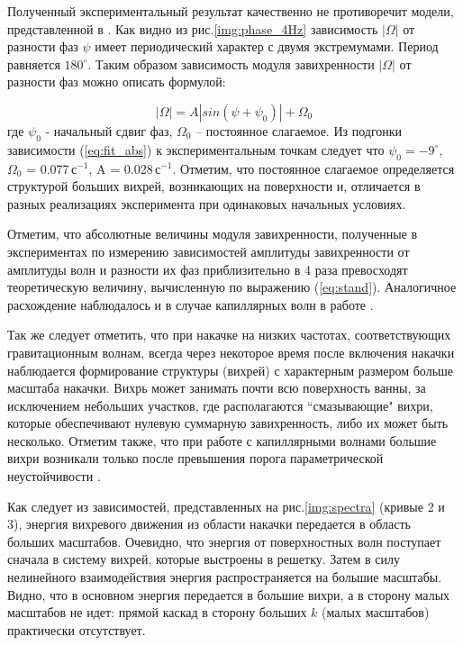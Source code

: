 Полученный экспериментальный результат качественно не противоречит модели, представленной в \cite{parf}. Как видно из рис.\ref{img:phase_4Hz} зависимость $|\Omega|$ от разности фаз $\psi$ имеет периодический характер с двумя экстремумами. Период равняется $180^\circ$. Таким образом зависимость модуля завихренности $|\Omega|$ от разности фаз можно описать формулой: 

\begin{equation}\label{eq:fit_abs}
|\Omega| = A |sin(\psi+\psi_0)| + \Omega_0
\end{equation}
где $\psi_0$ - начальный сдвиг фаз, $\Omega_0$ – постоянное слагаемое. Из подгонки зависимости (\ref{eq:fit_abs}) к экспериментальным точкам следует что $\psi_0 = -9^\circ$, $\Omega_0$ = 0.077\,с$^{-1}$, A = 0.028\,с$^{-1}$. Отметим, что постоянное слагаемое определяется структурой больших вихрей, возникающих на поверхности и, отличается в разных реализациях эксперимента при одинаковых начальных условиях. 

Отметим, что абсолютные величины модуля завихренности, полученные в экспериментах по измерению зависимостей амплитуды завихренности от амплитуды волн и разности их фаз приблизительно в 4 раза превосходят теоретическую величину, вычисленную по выражению (\ref{eq:stand}). Аналогичное расхождение наблюдалось и в случае капиллярных волн в работе \cite{parf}. 

Так же следует отметить, что при накачке на низких частотах, соответствующих гравитационным волнам, всегда через некоторое время после включения накачки наблюдается формирование структуры (вихрей) с характерным размером больше масштаба накачки. Вихрь может занимать почти всю поверхность ванны, за исключением небольших участков, где располагаются ``смазывающие" вихри, которые обеспечивают нулевую суммарную завихренность, либо их может быть несколько. Отметим также, что при работе с капиллярными волнами большие вихри возникали только после превышения порога параметрической неустойчивости \cite{shats}. 

Как следует из зависимостей, представленных на рис.\ref{img:spectra} (кривые 2 и 3), энергия вихревого движения из области накачки передается в область больших масштабов. Очевидно, что энергия от поверхностных волн поступает сначала в систему вихрей, которые выстроены в решетку. Затем в силу нелинейного взаимодействия энергия распространяется на большие масштабы. Видно, что в основном энергия передается в большие вихри, а в сторону малых масштабов не идет: прямой каскад в сторону больших $k$ (малых масштабов) практически отсутствует.

